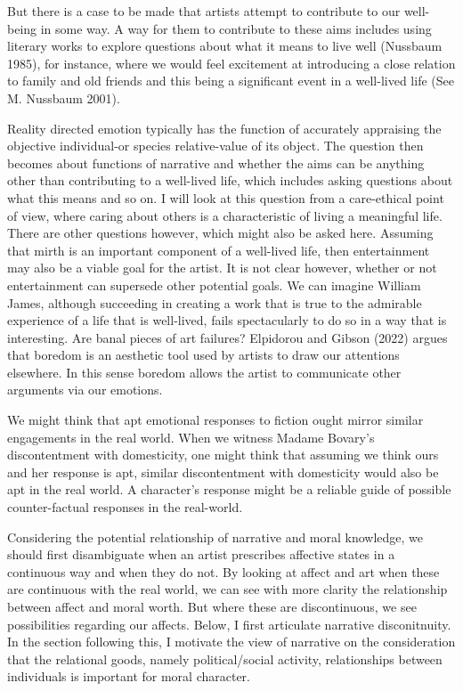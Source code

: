 \documentclass[
  letterpaper,
  DIV=11,
  numbers=noendperiod]{scrartcl}
\theoremstyle{remark}
\begin{document}
But there is a case to be made that artists attempt to contribute to our
well-being in some way. A way for them to contribute to these aims
includes using literary works to explore questions about what it means
to live well (Nussbaum 1985), for instance, where we would feel
excitement at introducing a close relation to family and old friends and
this being a significant event in a well-lived life (See M. Nussbaum
2001).

Reality directed emotion typically has the function of accurately
appraising the objective individual-or species relative-value of its
object. The question then becomes about functions of narrative and
whether the aims can be anything other than contributing to a well-lived
life, which includes asking questions about what this means and so on. I
will look at this question from a care-ethical point of view, where
caring about others is a characteristic of living a meaningful life.
There are other questions however, which might also be asked here.
Assuming that mirth is an important component of a well-lived life, then
entertainment may also be a viable goal for the artist. It is not clear
however, whether or not entertainment can supersede other potential
goals. We can imagine William James, although succeeding in creating a
work that is true to the admirable experience of a life that is
well-lived, fails spectacularly to do so in a way that is interesting.
Are banal pieces of art failures? Elpidorou and Gibson (2022) argues
that boredom is an aesthetic tool used by artists to draw our attentions
elsewhere. In this sense boredom allows the artist to communicate other
arguments via our emotions.

We might think that apt emotional responses to fiction ought mirror
similar engagements in the real world. When we witness Madame Bovary's
discontentment with domesticity, one might think that assuming we think
ours and her response is apt, similar discontentment with domesticity
would also be apt in the real world. A character's response might be a
reliable guide of possible counter-factual responses in the real-world.

Considering the potential relationship of narrative and moral knowledge,
we should first disambiguate when an artist prescribes affective states
in a continuous way and when they do not. By looking at affect and art
when these are continuous with the real world, we can see with more
clarity the relationship between affect and moral worth. But where these
are discontinuous, we see possibilities regarding our affects. Below, I
first articulate narrative disconitnuity. In the section following this,
I motivate the view of narrative on the consideration that the
relational goods, namely political/social activity, relationships
between individuals is important for moral character.
\end{document}
